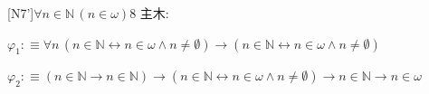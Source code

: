 \begin{fullproof}{[N7']}{$\forall n \in \mathbb{N}\,(n \in \omega)$}{8}\label{tree:NatOmega}
\noindent 主木:
\begin{ptree}
\end{ptree}
\begin{abbrevlist}
\item $\varphi_{1} :\equiv \forall n\,(n \in \mathbb{N} \leftrightarrow n \in \omega \land n \neq \emptyset) \to (n \in \mathbb{N} \leftrightarrow n \in \omega \land n \neq \emptyset)$
\item $\varphi_{2} :\equiv (n \in \mathbb{N} \to n \in \mathbb{N}) \to (n \in \mathbb{N} \leftrightarrow n \in \omega \land n \neq \emptyset) \to n \in \mathbb{N} \to n \in \omega$
\end{abbrevlist}
\end{fullproof}
